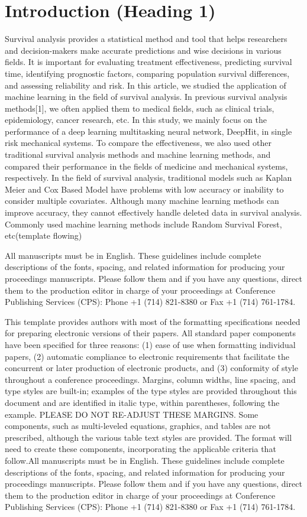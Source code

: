 \documentclass[conference]{IEEEconf}
\begin{document}
\section{Introduction (Heading 1)}
Survival analysis provides a statistical method and tool that helps researchers and decision-makers make accurate predictions and wise decisions in various fields. It is important for evaluating treatment effectiveness, predicting survival time, identifying prognostic factors, comparing population survival differences, and assessing reliability and risk. In this article, we studied the application of machine learning in the field of survival analysis. In previous survival analysis methods[1], we often applied them to medical fields, such as clinical trials, epidemiology, cancer research, etc. In this study, we mainly focus on the performance of a deep learning multitasking neural network, DeepHit, in single risk mechanical systems. To compare the effectiveness, we also used other traditional survival analysis methods and machine learning methods, and compared their performance in the fields of medicine and mechanical systems, respectively. In the field of survival analysis, traditional models such as Kaplan Meier and Cox Based Model have problems with low accuracy or inability to consider multiple covariates. Although many machine learning methods can improve accuracy, they cannot effectively handle deleted data in survival analysis. Commonly used machine learning methods include Random Survival Forest, etc(template flowing)

All manuscripts must be in English. These guidelines include complete descriptions of the fonts, spacing, and related information for producing your proceedings manuscripts. Please follow them and if you have any questions, direct them to the production editor in charge of your proceedings at Conference Publishing Services (CPS): Phone +1 (714) 821-8380 or Fax +1 (714) 761-1784.

This template provides authors with most of the formatting specifications needed for preparing electronic versions of their papers. All standard paper components have been specified for three reasons: (1) ease of use when formatting individual papers, (2) automatic compliance to electronic requirements that facilitate the concurrent or later production of electronic products, and (3) conformity of style throughout a conference proceedings. Margins, column widths, line spacing, and type styles are built-in; examples of the type styles are provided throughout this document and are identified in italic type, within parentheses, following the example. PLEASE DO NOT RE-ADJUST THESE MARGINS. Some components, such as multi-leveled equations, graphics, and tables are not prescribed, although the various table text styles are provided. The format will need to create these components, incorporating the applicable criteria that follow.All manuscripts must be in English. These guidelines include complete descriptions of the fonts, spacing, and related information for producing your proceedings manuscripts. Please follow them and if you have any questions, direct them to the production editor in charge of your proceedings at Conference Publishing Services (CPS): Phone +1 (714) 821-8380 or Fax +1 (714) 761-1784.
\end{document}
